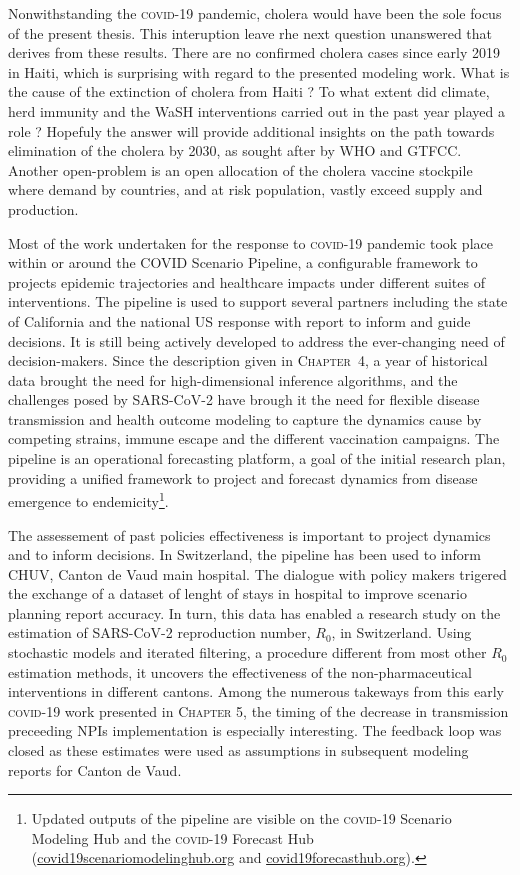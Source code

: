 Nonwithstanding the \textsc{covid}-19 pandemic, cholera would have been the sole focus of the present thesis. This interuption leave rhe next question unanswered  that derives from these results. There are no confirmed cholera cases since early 2019 in Haiti, which is surprising with regard to the presented modeling work. What is the cause of the extinction of cholera from Haiti ? To what extent did climate, herd immunity and the WaSH interventions carried out in the past year played a role ? Hopefuly the answer will provide additional insights on the path towards elimination of the cholera by 2030, as sought after by WHO and GTFCC. Another open-problem is an open allocation of the cholera vaccine stockpile where demand by countries, and at risk population, vastly exceed supply and production\cite{Pezzoli:GlobalOralCholera:2019}. 

Most of the work undertaken for the response to \textsc{covid}-19 pandemic took place within or around the COVID Scenario Pipeline, a configurable framework to projects epidemic trajectories and healthcare impacts under different suites of interventions. The pipeline is used to support several partners including the state of California and the national US response with report to inform and guide decisions. It is still being actively developed to address the ever-changing need of decision-makers. Since the description given in \textsc{Chapter~4}, a year of historical data brought the need for high-dimensional inference algorithms, and the challenges posed by SARS-CoV-2 have brough it the need for flexible disease transmission and health outcome modeling to capture the dynamics cause by competing strains, immune escape and the different vaccination campaigns. The pipeline is an operational forecasting platform, a goal of the initial research plan, providing a unified framework to project and forecast dynamics from disease emergence to endemicity\footnote{Updated outputs of the pipeline are visible on the \textsc{covid}-19 Scenario Modeling Hub and the \textsc{covid}-19 Forecast Hub (\url{covid19scenariomodelinghub.org} and \url{covid19forecasthub.org}).}.

The assessement of past policies effectiveness is important to project dynamics and to inform decisions. In Switzerland, the pipeline has been used to inform CHUV, Canton de Vaud main hospital. The dialogue with policy makers trigered the exchange of a dataset of lenght of stays in hospital to improve scenario planning report accuracy. In turn, this data has enabled a research study on the estimation of SARS-CoV-2 reproduction number, $R_0$, in Switzerland. Using stochastic models and iterated filtering, a procedure different from most other $R_0$ estimation methods, it uncovers the effectiveness of the non-pharmaceutical interventions in different cantons. Among the numerous takeways from this early \textsc{covid}-19 work presented in \textsc{Chapter 5}, the timing of the decrease in transmission preceeding NPIs implementation is especially interesting. The feedback loop was closed as these estimates were used as assumptions in subsequent modeling reports for Canton de Vaud.


